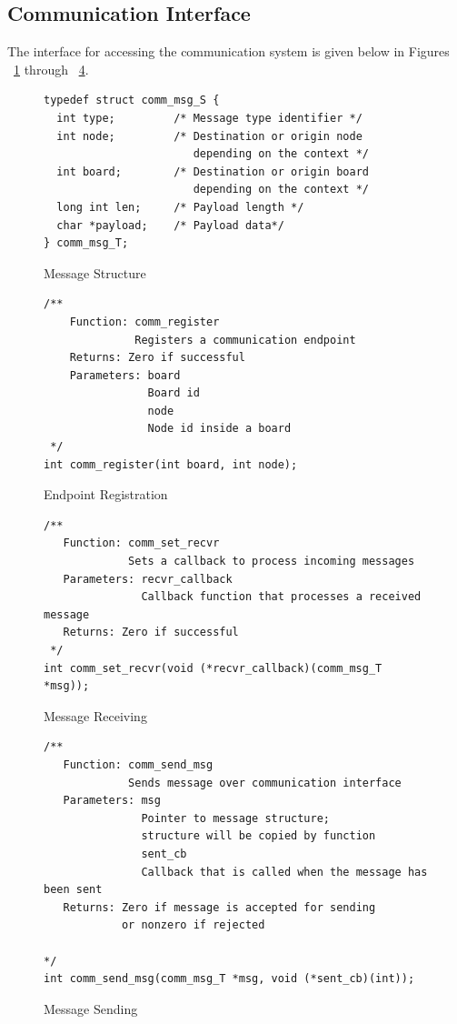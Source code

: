 \documentclass{scrreprt}
\begin{document}
\subsection{Communication Interface}
The interface for accessing the communication system is given below
in Figures ~\ref{fig:msg-struct} through ~\ref{fig:comm-send-msg}. %
\begin{figure}[!htb]
\lstset{language=C}
\begin{lstlisting}[frame=single]
typedef struct comm_msg_S {
  int type;         /* Message type identifier */
  int node;         /* Destination or origin node  
                       depending on the context */
  int board;        /* Destination or origin board 
                       depending on the context */
  long int len;     /* Payload length */
  char *payload;    /* Payload data*/  
} comm_msg_T;
\end{lstlisting}
\caption{Message Structure}
\label{fig:msg-struct}
\end{figure}

\begin{figure}[!htb]
\begin{lstlisting}[frame=single]
/**
    Function: comm_register 
              Registers a communication endpoint
    Returns: Zero if successful
    Parameters: board
                Board id
                node
                Node id inside a board
 */
int comm_register(int board, int node);
\end{lstlisting}
\caption{Endpoint Registration}
\label{fig:comm-reg}
\end{figure}

\begin{figure}[!htb]
\begin{lstlisting}[frame=single]
/**
   Function: comm_set_recvr
             Sets a callback to process incoming messages
   Parameters: recvr_callback 
               Callback function that processes a received message
   Returns: Zero if successful		  
 */
int comm_set_recvr(void (*recvr_callback)(comm_msg_T *msg));
\end{lstlisting}
\caption{Message Receiving}
\label{fig:comm-set-recvr}
\end{figure}

\begin{figure}[!htb]
\begin{lstlisting}[frame=single]
/** 
   Function: comm_send_msg
             Sends message over communication interface
   Parameters: msg 
               Pointer to message structure; 
               structure will be copied by function
               sent_cb 
               Callback that is called when the message has been sent
   Returns: Zero if message is accepted for sending 
            or nonzero if rejected

*/
int comm_send_msg(comm_msg_T *msg, void (*sent_cb)(int)); 
\end{lstlisting}
\caption{Message Sending}
\label{fig:comm-send-msg}
\end{figure}
\end{document}
